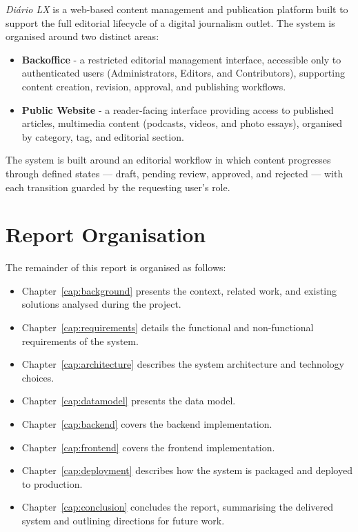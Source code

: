 \textit{Diário LX} is a web-based content management and publication platform
built to support the full editorial lifecycle of a digital journalism
outlet. The system is organised around two distinct areas:

\begin{itemize}
      \item \textbf{Backoffice} - a restricted editorial management interface, accessible only to authenticated users (Administrators, Editors, and Contributors), supporting content creation, revision, approval, and publishing workflows.
      \item \textbf{Public Website} - a reader-facing interface providing access to published articles, multimedia content (podcasts, videos, and photo essays), organised by category, tag, and editorial section.
\end{itemize}

The system is built around an editorial workflow in which content progresses through
defined states — draft, pending review, approved, and rejected — with each transition
guarded by the requesting user's role.

\section{Report Organisation} \label{sec:intro_organization}

The remainder of this report is organised as follows:

\begin{itemize}
      \item Chapter~\ref{cap:background} presents the context, related work, and existing solutions analysed during the project.
      \item Chapter~\ref{cap:requirements} details the functional and non-functional requirements of the system.
      \item Chapter~\ref{cap:architecture} describes the system architecture and technology choices.
      \item Chapter~\ref{cap:datamodel} presents the data model.
      \item Chapter~\ref{cap:backend} covers the backend implementation.
      \item Chapter~\ref{cap:frontend} covers the frontend implementation.
      \item Chapter~\ref{cap:deployment} describes how the system is packaged and deployed to production.
      \item Chapter~\ref{cap:conclusion} concludes the report, summarising the delivered system and outlining directions for future work.
\end{itemize}


